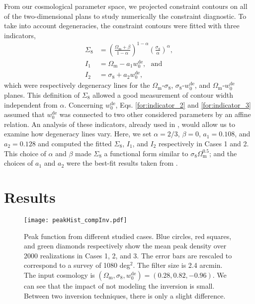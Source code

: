 \documentclass{aa} %
\newcommand{\OmegaM}{\Omega_\mathrm{m}}
\newcommand{\sigEig}{\sigma_8}
\newcommand{\wZero}{w_0^\mathrm{de}}
\newcommand{\PaperIII}{\citetalias{Lin_etal_2016a}}
\begin{document}
From our cosmological parameter space, we projected constraint contours on all of the two-dimensional plans to study numerically the constraint diagnostic. To take into account degeneracies, the constraint contours were fitted with three indicators,
\begin{align}
        \Sigma_8 &= \left(\frac{\OmegaM+\beta}{1-\alpha}\right)^{1-\alpha} \left(\frac{\sigma_8}{\alpha}\right)^\alpha, \label{for:indicator_1}\\
        I_1 &= \OmegaM - a_1 \wZero,\ \ \ \text{and} \label{for:indicator_2}\\
        I_2 &= \sigEig + a_2 \wZero, \label{for:indicator_3}
\end{align}
which were respectively degeneracy lines for the $\OmegaM$-$\sigEig$, $\sigEig$-$\wZero$, and $\OmegaM$-$\wZero$ planes. This definition of $\Sigma_8$ allowed a good measurement of contour width independent from $\alpha$. Concerning $\wZero$, Eqs. \eqref{for:indicator_2} and \eqref{for:indicator_3} assumed that $\wZero$ was connected to two other considered parameters by an affine relation. An analysis of these indicators, already used in \PaperIII, would allow us to examine how degeneracy lines vary. Here, we set $\alpha=2/3$, $\beta=0$, $a_1=0.108$, and $a_2=0.128$ and computed the fitted $\Sigma_8$, $I_1$, and $I_2$ respectively in Cases 1 and 2. This choice of $\alpha$ and $\beta$ made $\Sigma_8$ a functional form similar to $\sigEig\OmegaM^{0.5}$; and the choices of $a_1$ and $a_2$ were the best-fit results taken from \PaperIII.


\section{Results}
\label{sect:results}

\begin{figure}[tb]
        \centering
        \texttt{[image: peakHist\_compInv.pdf]}
        \caption{Peak function from different studied cases. Blue circles, red squares, and green diamonds respectively show the mean peak density over 2000 realizations in Cases 1, 2, and 3. The error bars are rescaled to correspond to a survey of 1080 deg$^2$. The filter size is 2.4 arcmin. The input cosmology is $(\OmegaM, \sigEig, \wZero)=(0.28, 0.82, -0.96)$. We can see that the impact of not modeling the inversion is small. Between two inversion techniques, there is only a slight difference.}
        \label{fig:peakHist_compInv}
\end{figure}
\end{document}
